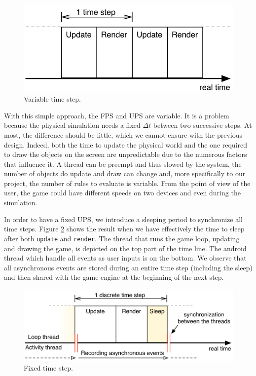 \documentclass[11pt,a4paper]{article}
\begin{document}
\begin{figure}[h]
\centering
\includegraphics[scale = 0.8]{images/variableTimeStep} 
\caption{Variable time step.}
\label{fig:variableTimeStep}
\end{figure}

With this simple approach, the FPS and UPS are variable. It is a problem because the physical simulation needs a fixed $\Delta t$ between two successive steps. At most, the difference should be little, which we cannot ensure with the previous design. Indeed, both the time to update the physical world and the one required to draw the objects on the screen are unpredictable due to the numerous factors that influence it. A thread can be preempt and thus slowed by the system, the number of objects do update and draw can change and, more specifically to our project, the number of rules to evaluate is variable. From the point of view of the user, the game could have different speeds on two devices and even during the simulation.

In order to have a fixed UPS, we introduce a sleeping period to synchronize all time steps. Figure \ref{fig:fixedTimeStep} shows the result when we have effectively the time to sleep after both \texttt{update} and \texttt{render}. The thread that runs the game loop, updating and drawing the game, is depicted on the top part of the time line. The android thread which handle all events as user inputs is on the bottom. We observe that all asynchronous events are stored during an entire time step (including the sleep) and then shared with the game engine at the beginning of the next step.

\begin{figure}[h]
\centering
\includegraphics[scale = 0.8]{images/fixedTimeStep} 
\caption{Fixed time step.}
\label{fig:fixedTimeStep}
\end{figure}
\end{document}
